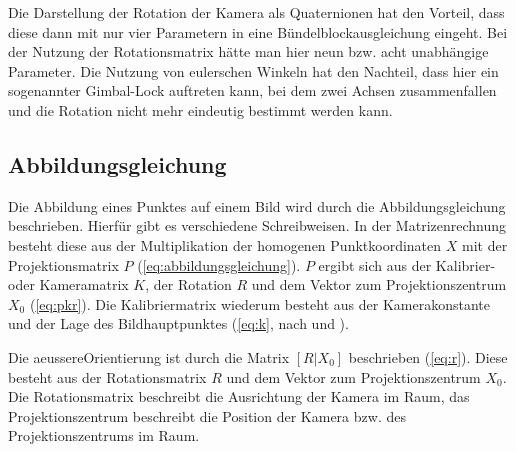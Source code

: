 \documentclass[./00PhotoBox.tex]{subfiles}
\begin{document}
Die Darstellung der Rotation der Kamera als Quaternionen hat den Vorteil, dass diese dann mit nur vier Parametern in eine Bündelblockausgleichung eingeht. Bei der Nutzung der Rotationsmatrix hätte man hier neun bzw. acht unabhängige Parameter. Die Nutzung von eulerschen Winkeln hat den Nachteil, dass hier ein sogenannter Gimbal-Lock auftreten kann, bei dem zwei Achsen zusammenfallen und die Rotation nicht mehr eindeutig bestimmt werden kann. \citep[vgl.][S. 63]{luhmann}

\subsection{Abbildungsgleichung}
\label{ss:abbildungsgleichung}
Die Abbildung eines Punktes auf einem Bild wird durch die Abbildungsgleichung beschrieben. Hierfür gibt es verschiedene Schreibweisen. In der Matrizenrechnung besteht diese aus der Multiplikation der homogenen Punktkoordinaten $X$ mit der Projektionsmatrix $P$ (\autoref{eq:abbildungsgleichung}). $P$ ergibt sich aus der Kalibrier- oder Kameramatrix $K$, der Rotation $R$ und dem Vektor zum Projektionszentrum $X_0$ (\autoref{eq:pkr}). Die Kalibriermatrix wiederum besteht aus der \Gls{Kamerakonstante} und der Lage des \Gls{Bildhauptpunkt}es (\autoref{eq:k}, nach \citealp[S. 244]{hartley} und \citealp[S. 290]{luhmann}).

Die \gls{aeussereOrientierung} ist durch die Matrix $[R|X_0]$ beschrieben (\autoref{eq:r}). Diese besteht aus der Rotationsmatrix $R$ und dem Vektor zum Projektionszentrum $X_0$. Die Rotationsmatrix beschreibt die Ausrichtung der Kamera im Raum, das Projektionszentrum beschreibt die Position der Kamera bzw. des Projektionszentrums im Raum.
\end{document}

